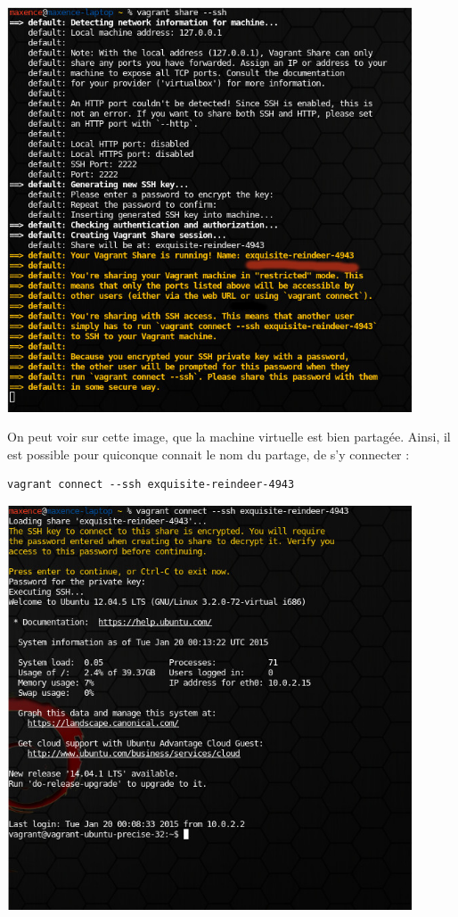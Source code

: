 \documentclass[12pt,a4paper]{article}
\begin{document}
\begin{center}
	\includegraphics[width=12cm]{images_rapport/vagrantshare.jpg}
\end{center}

On peut voir sur cette image, que la machine virtuelle est bien partagée. Ainsi, il est possible pour quiconque connait le nom du partage, de s'y connecter : 

\begin{lstlisting}
vagrant connect --ssh exquisite-reindeer-4943
\end{lstlisting}

\begin{center}
	\includegraphics[width=12cm]{images_rapport/vagrantconnect.jpg}
\end{center}
\end{document}
